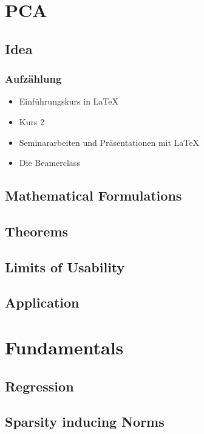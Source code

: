 \documentclass{beamer}
\begin{document}
\section{PCA} 
\subsection{Idea}
\begin{frame}\frametitle{Aufz\"ahlung}
\begin{itemize}
\item Einf\"uhrungskurs in \LaTeX  
\item Kurs 2  
\item Seminararbeiten und Pr\"asentationen mit \LaTeX 
\item Die Beamerclass 
\end{itemize} 
\end{frame}

\subsection{Mathematical Formulations}
\subsection{Theorems}
\subsection{Limits of Usability}
\subsection{Application}


\section{Fundamentals}

\subsection{Regression}
\subsection{Sparsity inducing Norms}
\end{document}
